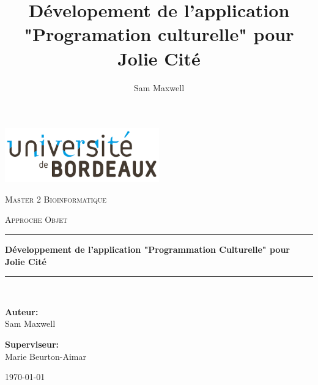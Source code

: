 \documentclass{report}
\title{Dévelopement de l'application "Programation culturelle" pour Jolie Cité}
\author{Sam Maxwell}
\begin{document}
\begin{titlepage}
	\centering
	\includegraphics[width=0.5\textwidth]{logo_bx.png}\par\vspace{1cm}
	{\scshape\LARGE Master 2 Bioinformatique \par}
	\vspace{1cm}
	{\scshape\Large Approche Objet\par}
	\vspace{1.5cm}
    \par\noindent\rule{\textwidth}{0.5pt}
	{\huge\bfseries Développement de l'application "Programmation Culturelle" pour Jolie Cité\par}
    \par\noindent\rule{\textwidth}{0.5pt}\\[1cm]
	\vspace{2cm}
    \begin{minipage}[t]{0.47\textwidth}\raggedright
        \textnormal{\large{\bf Auteur:\\}}
        {\large Sam Maxwell}
    \end{minipage}\hfill\begin{minipage}[t]{0.5\linewidth}\raggedleft
        \textnormal{\large{\bf Superviseur:\\}}
        {\large Marie Beurton-Aimar}
    \end{minipage}
	\vfill

	{\large \today\par}
\end{titlepage}
\tableofcontents
\clearpage




\end{document}
